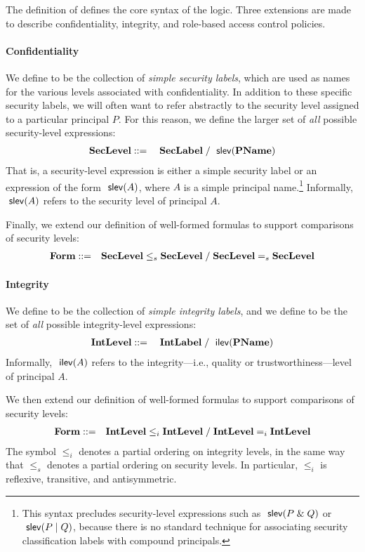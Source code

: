 The definition of \LExp defines the core syntax of the logic. Three
extensions are made to describe confidentiality, integrity, and
role-based access control policies.

\paragraph*{Confidentiality}

We define \LabelConst to be the collection of \emph{simple security
  labels}, which are used as names for the various levels associated
with confidentiality. In addition to these specific security labels,
we will often want to refer abstractly to the security level assigned
to a particular principal $P$.  For this reason, we define the larger
set \Level of \emph{all} possible security-level expressions:
\begin{eqnarray*}
  \textbf{SecLevel} &\; {:}{:}{=} \;& \textbf{SecLabel} \;/\;  \text{\textsf{ slev}}(\textbf{PName})
\end{eqnarray*}
That is, a security-level expression is either a simple security label
or an expression of the form $\text{\textsf{ slev}}(A)$, where $A$ is a simple principal
name.\footnote{This syntax precludes security-level expressions such as
  $\text{\textsf{ slev}}(P\;\&\; Q)$ or $\text{\textsf{ slev}}(P\;|\; Q)$, because there is no standard
  technique for associating security classification labels with compound
  principals.} Informally, $\text{\textsf{ slev}}(A)$ refers to the security level of
principal $A$.

Finally, we extend our definition of well-formed formulas to support
comparisons of security levels:
\begin{eqnarray*}
    \textbf{Form} &::=&  \textbf{SecLevel} \leq_s \textbf{SecLevel} \;/\; \textbf{SecLevel} =_s \textbf{SecLevel} 
\end{eqnarray*}

\paragraph*{Integrity}

We define \IntLabelConst to be the collection of \emph{simple
  integrity labels}, and we define \IntLevel to be the set of
\emph{all} possible integrity-level expressions:
\begin{eqnarray*}
  \textbf{IntLevel} &\; {:}{:}{=} \;& \textbf{IntLabel} \;/\;  \text{\textsf{ ilev}}(\textbf{PName})
\end{eqnarray*}
Informally, $\text{\textsf{ ilev}}(A)$ refers to the integrity---i.e., quality or
trustworthiness---level of principal $A$.

We then extend our definition of well-formed formulas to support
comparisons of security levels:
\begin{eqnarray*}
    \textbf{Form} &::=&  \textbf{IntLevel} \leq_i \textbf{IntLevel} \;/\; \textbf{IntLevel} =_i \textbf{IntLevel} 
\end{eqnarray*}
The symbol $\leq_i$ denotes a partial ordering on integrity levels, in
the same way that $\leq_s$ denotes a partial ordering on security
levels.  In particular, $\leq_i$ is reflexive, transitive, and
antisymmetric.

